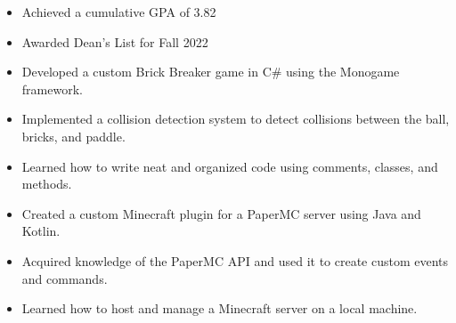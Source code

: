 \documentclass[10pt,a4paper,ragged2e,withhyper]{altacv}
\begin{document}


\makecvheader


\begin{paracol}{2}

\begin{itemize}
  \item Achieved a cumulative GPA of 3.82
  \item Awarded Dean's List for Fall 2022
\end{itemize}


\begin{itemize}
  \item Developed a custom Brick Breaker game in C\# using the Monogame framework.
  \item Implemented a collision detection system to detect collisions between the ball, bricks, and paddle.
  \item Learned how to write neat and organized code using comments, classes, and methods.
\end{itemize}

\divider

\begin{itemize}
  \item Created a custom Minecraft plugin for a PaperMC server using Java and Kotlin.
  \item Acquired knowledge of the PaperMC API and used it to create custom events and commands.
  \item Learned how to host and manage a Minecraft server on a local machine.
\end{itemize}

\divider


\end{paracol}
\end{document}
